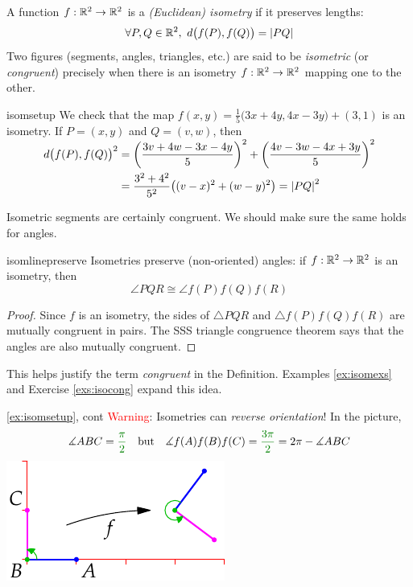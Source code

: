 \begin{defn}{}{}
	A function $f:\mathbb{R}^2\to\mathbb{R}^2$ is a \emph{(Euclidean) isometry} if it preserves lengths:\footnotemark
	\[
		\forall P,Q\in\R^2,\ d\bigl(f(P),f(Q)\bigr)=\nm{PQ}
	\]
	Two figures (segments, angles, triangles, etc.) are said to be \emph{isometric} (or \emph{congruent}) precisely when there is an isometry $f:\mathbb{R}^2\to\mathbb{R}^2$ mapping one to the other.
\end{defn}



\begin{example}{}{isomsetup}
	We check that the map $f(x,y)=\frac 15\bigl(3x+4y,4x-3y\bigr)+(3,1)$ is an isometry. If $P=(x,y)$ and $Q=(v,w)$, then
	\begin{align*}
		d\bigl(f(P),f(Q)\bigr)^2&=\smash[t]{\left(\frac{3v+4w-3x-4y}5\right)^2+\left(\frac{4v-3w-4x+3y}5\right)^2}\\
		&=\frac{3^2+4^2}{5^2}\bigl((v-x)^2+(w-y)^2\bigr) =\left| PQ\right|^2
	\end{align*}
\end{example}

Isometric segments are certainly congruent. We should make sure the same holds for angles.

\begin{lemm}{}{isomlinepreserve}
	Isometries preserve (non-oriented) angles: if $f:\mathbb{R}^2\to\mathbb{R}^2$ is an isometry, then
	\[
	  \angle PQR\cong \angle f(P)f(Q)f(R)
	\]
\end{lemm}

\begin{proof}
	Since $f$ is an isometry, the sides of $\triangle PQR$ and $\triangle f(P)f(Q)f(R)$ are mutually congruent in pairs. The SSS triangle congruence theorem says that the angles are also mutually congruent.
\end{proof}

This helps justify the term \emph{congruent} in the Definition. Examples \ref{ex:isomexs} and Exercise \ref{exs:isocong} expand this idea.

\begin{example*}[lower separated=false, sidebyside, sidebyside align=top seam, sidebyside gap=0pt, righthand width=0.32\linewidth]{\ref{ex:isomsetup}, cont}{}
	\textcolor{red}{Warning}: Isometries can \emph{reverse orientation}! In the picture,
	\[
		\measuredangle ABC=\textcolor{Green}{\frac\pi 2}
		\quad\text{but}\quad
		\measuredangle f(A)f(B)f(C)=\textcolor{Green}{\frac{3\pi}2}=2\pi-\measuredangle ABC
	\]
	\tcblower
	\flushright
	\includegraphics{isom-refl2}
\end{example*}

